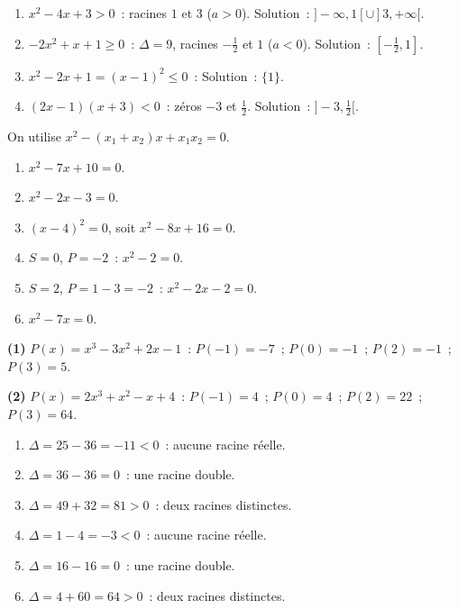 
\begin{enumerate}
  \item $x^2-4x+3>0$~: racines $1$ et $3$ ($a>0$). Solution~: $]-\infty,1[\cup]3,+\infty[$.
  \item $-2x^2+x+1\geq0$~: $\Delta=9$, racines $-\frac{1}{2}$ et $1$ ($a<0$).
        Solution~: $[-\frac{1}{2},1]$.
  \item $x^2-2x+1=(x-1)^2\leq0$~: Solution~: $\{1\}$.
  \item $(2x-1)(x+3)<0$~: z\'eros $-3$ et $\frac{1}{2}$.
        Solution~: $]-3,\frac{1}{2}[$.
\end{enumerate}


On utilise $x^2-(x_1+x_2)x+x_1x_2=0$.
\begin{enumerate}
  \item $x^2-7x+10=0$.
  \item $x^2-2x-3=0$.
  \item $(x-4)^2=0$, soit $x^2-8x+16=0$.
  \item $S=0$, $P=-2$~: $x^2-2=0$.
  \item $S=2$, $P=1-3=-2$~: $x^2-2x-2=0$.
  \item $x^2-7x=0$.
\end{enumerate}


\textbf{(1)} $P(x)=x^3-3x^2+2x-1$~:
$P(-1)=-7$~; $P(0)=-1$~; $P(2)=-1$~; $P(3)=5$.

\textbf{(2)} $P(x)=2x^3+x^2-x+4$~:
$P(-1)=4$~; $P(0)=4$~; $P(2)=22$~; $P(3)=64$.


\begin{enumerate}
  \item $\Delta=25-36=-11<0$~: aucune racine r\'eelle.
  \item $\Delta=36-36=0$~: une racine double.
  \item $\Delta=49+32=81>0$~: deux racines distinctes.
  \item $\Delta=1-4=-3<0$~: aucune racine r\'eelle.
  \item $\Delta=16-16=0$~: une racine double.
  \item $\Delta=4+60=64>0$~: deux racines distinctes.
\end{enumerate}

